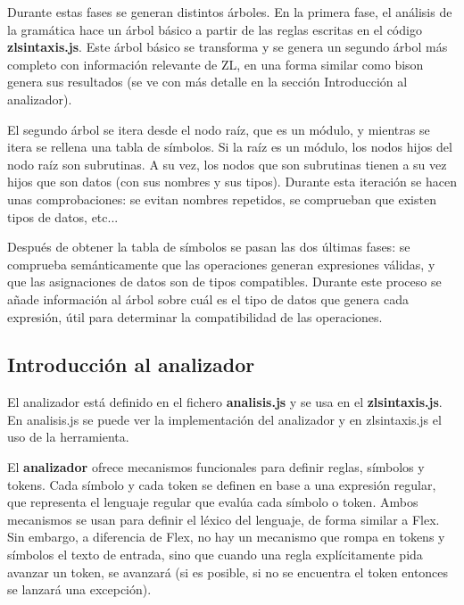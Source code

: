 \documentclass{report}
\begin{document}
		
	Durante estas fases se generan distintos árboles. En la primera fase, el análisis de la gramática hace un árbol básico a partir de las reglas escritas en el código \textbf{zlsintaxis.js}. Este árbol básico se transforma y se genera un segundo árbol más completo con información relevante de ZL, en una forma similar como bison genera sus resultados (se ve con más detalle en la sección Introducción al analizador).
	
	\vspace{10px}
	
	El segundo árbol se itera desde el nodo raíz, que es un módulo, y mientras se itera se rellena una tabla de símbolos. Si la raíz es un módulo, los nodos hijos del nodo raíz son subrutinas. A su vez, los nodos que son subrutinas tienen a su vez hijos que son datos (con sus nombres y sus tipos). Durante esta iteración se hacen unas comprobaciones: se evitan nombres repetidos, se comprueban que existen tipos de datos, etc...
	
	Después de obtener la tabla de símbolos se pasan las dos últimas fases: se comprueba semánticamente que las operaciones generan expresiones válidas, y que las asignaciones de datos son de tipos compatibles. Durante este proceso se añade información al árbol sobre cuál es el tipo de datos que genera cada expresión, útil para determinar la compatibilidad de las operaciones. 	
	
	\subsection{Introducción al analizador}

	El analizador está definido en el fichero \textbf{analisis.js} y se usa en el \textbf{zlsintaxis.js}. En analisis.js se puede ver la implementación del analizador y en zlsintaxis.js el uso de la herramienta.
	
	\vspace{10px}

	El \textbf{analizador} ofrece mecanismos funcionales\cite{javascriptfunctional} para definir reglas, símbolos y tokens. Cada símbolo y cada token se definen en base a una expresión regular, que representa el lenguaje regular que evalúa cada símbolo o token. Ambos mecanismos se usan para definir el léxico del lenguaje, de forma similar a Flex. Sin embargo, a diferencia de Flex, no hay un mecanismo que rompa en tokens y símbolos el texto de entrada, sino que cuando una regla explícitamente pida avanzar un token, se avanzará (si es posible, si no se encuentra el token entonces se lanzará una excepción).
	
\end{document}
